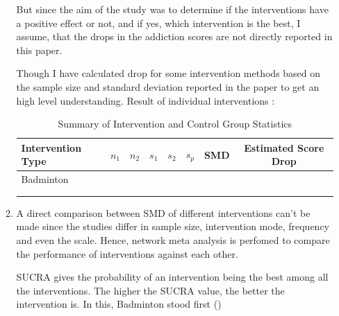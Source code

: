 \documentclass{article}
\begin{document}
\begin{enumerate}
\begin{enumerate}
        But since the aim of the study was to determine if the interventions have a positive effect or not, and if yes, which intervention is the best, I assume, that the drops in the addiction scores are not directly reported in this paper.

        Though I have calculated drop for some intervention methods based on the sample size and standard deviation reported in the paper to get an high level understanding. 
        Result of individual interventions : 
        
        \begin{table}[h]
            \centering
            \begin{tabular}{lccccccc}
            \toprule
            \textbf{Intervention Type} &
            \textbf{$n_1$} &
            \textbf{$n_2$} &

            \textbf{$s_1$} &
            \textbf{$s_2$} &
            \textbf{$s_p$} &
            \textbf{SMD} &
            \textbf{Estimated Score Drop} \\
            \midrule
            Badminton & & & & & & & \\
            & & & & & & & \\
            & & & & & & & \\
            \bottomrule
            \end{tabular}
            \caption{Summary of Intervention and Control Group Statistics}
            \label{tab:intervention_summary}
        \end{table}

        \item A direct comparison between SMD of different interventions can't be made since the studies differ in sample size, intervention mode, frequency and even the scale. Hence, network meta analysis is perfomed to compare the performance of interventions against each other. 
        
        SUCRA gives the probability of an intervention being the best among all the interventions. The higher the SUCRA value, the better the intervention is. In this, Badminton stood first ()


        
    \end{enumerate}



    
\end{enumerate}
\end{document}
